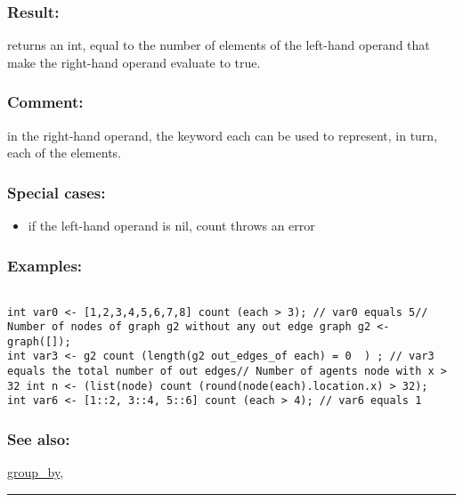 \documentclass[]{book}
\providecommand{\tightlist}{%
  \setlength{\itemsep}{0pt}\setlength{\parskip}{0pt}}
\theoremstyle{definition}
\theoremstyle{definition}
\theoremstyle{definition}
\theoremstyle{remark}
\begin{document}
\subsubsection{Result:}\label{result-109}

returns an int, equal to the number of elements of the left-hand operand
that make the right-hand operand evaluate to true.

\subsubsection{Comment:}\label{comment-27}

in the right-hand operand, the keyword each can be used to represent, in
turn, each of the elements.

\subsubsection{Special cases:}\label{special-cases-41}

\begin{itemize}
\tightlist
\item
  if the left-hand operand is nil, count throws an error
\end{itemize}

\subsubsection{Examples:}\label{examples-85}

\begin{verbatim}
 
int var0 <- [1,2,3,4,5,6,7,8] count (each > 3); // var0 equals 5// Number of nodes of graph g2 without any out edge graph g2 <- graph([]);  
int var3 <- g2 count (length(g2 out_edges_of each) = 0  ) ; // var3 equals the total number of out edges// Number of agents node with x > 32 int n <- (list(node) count (round(node(each).location.x) > 32);  
int var6 <- [1::2, 3::4, 5::6] count (each > 4); // var6 equals 1
\end{verbatim}

\subsubsection{See also:}\label{see-also-69}

\href{OperatorsDH\#group_by}{group\_by},

\begin{center}\rule{0.5\linewidth}{\linethickness}\end{center}
\end{document}
